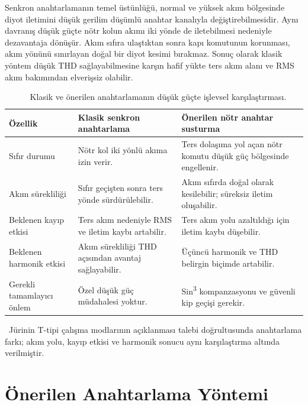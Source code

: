 Senkron anahtarlamanın temel üstünlüğü, normal ve yüksek akım bölgesinde diyot iletimini düşük gerilim düşümlü anahtar kanalıyla değiştirebilmesidir. Aynı davranış düşük güçte nötr kolun akımı iki yönde de iletebilmesi nedeniyle dezavantaja dönüşür. Akım sıfıra ulaştıktan sonra kapı komutunun korunması, akım yönünü sınırlayan doğal bir diyot kesimi bırakmaz. Sonuç olarak klasik yöntem düşük THD sağlayabilmesine karşın hafif yükte ters akım alanı ve RMS akım bakımından elverişsiz olabilir.

\begin{table}[htbp]
  \centering
  \caption{\eskitezetiketi\ \juriistegietiketi\ Klasik ve önerilen anahtarlamanın düşük güçte işlevsel karşılaştırması.}
  \label{tab:klasik-onerilen-islevsel}
  \small
  \begin{tabularx}{\textwidth}{p{} X X}
    \toprule
    Özellik & Klasik senkron anahtarlama & Önerilen nötr anahtar susturma \\
    \midrule
    Sıfır durumu & Nötr kol iki yönlü akıma izin verir. & Ters dolaşıma yol açan nötr komutu düşük güç bölgesinde engellenir. \\
    Akım sürekliliği & Sıfır geçişten sonra ters yönde sürdürülebilir. & Akım sıfırda doğal olarak kesilebilir; süreksiz iletim oluşabilir. \\
    Beklenen kayıp etkisi & Ters akım nedeniyle RMS ve iletim kaybı artabilir. & Ters akım yolu azaltıldığı için iletim kaybı düşebilir. \\
    Beklenen harmonik etkisi & Akım sürekliliği THD açısından avantaj sağlayabilir. & Üçüncü harmonik ve THD belirgin biçimde artabilir. \\
    Gerekli tamamlayıcı önlem & Özel düşük güç müdahalesi yoktur. & Sin\textsuperscript{3} kompanzasyonu ve güvenli kip geçişi gerekir. \\
    \bottomrule
  \end{tabularx}
\end{table}

\begin{center}
\juriistegietiketi\ \small Jürinin T-tipi çalışma modlarının açıklanması talebi doğrultusunda anahtarlama farkı; akım yolu, kayıp etkisi ve harmonik sonucu aynı karşılaştırma altında verilmiştir.
\end{center}

\section{Önerilen Anahtarlama Yöntemi}

